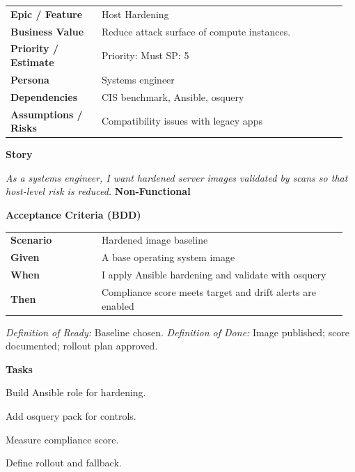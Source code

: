 \documentclass[11pt,letterpaper]{article}
\makeatletter
\newenvironment{kvtable}{%
  \begin{tabular}{@{}>{\bfseries\arraybackslash}p{0.26\linewidth} p{0.70\linewidth}@{}}
}{\end{tabular}}
\newenvironment{bdd}{%
  \begin{tabular}{@{}>{\bfseries\arraybackslash}p{0.26\linewidth} p{0.70\linewidth}@{}}
}{\end{tabular}}
\newcommand{\DoRDoD}[2]{%
  \vspace{0.35em}
  {\footnotesize\color{Muted}%
    \textit{Definition of Ready:} #1 \; \textbullet\;
    \textit{Definition of Done:} #2%
  }%
}
\newenvironment{storycard}[2]{%
  \begin{tcolorbox}[cloudcard, title={#1 --- #2}]%
}{\end{tcolorbox}}
\newcommand{\sectionlabel}[1]{\vspace{0.35em}\textbf{#1}\par}
\makeatother
\begin{document}
\begin{storycard}{CCS-17}{Ch. 17 — Locking Down Cloud Servers}
\begin{kvtable}
Epic / Feature & Host Hardening\\
Business Value & Reduce attack surface of compute instances.\\
Priority / Estimate & Priority: Must \quad SP: 5\\
Persona & Systems engineer\\
Dependencies & CIS benchmark, Ansible, osquery\\
Assumptions / Risks & Compatibility issues with legacy apps\\
\end{kvtable}
\sectionlabel{Story}
\textit{As a systems engineer, I want hardened server images validated by scans so that host-level risk is reduced.}
\sectionlabel{Non-Functional}\;
\sectionlabel{Acceptance Criteria (BDD)}
\begin{bdd}
Scenario & Hardened image baseline\\
Given & A base operating system image\\
When & I apply Ansible hardening and validate with osquery\\
Then & Compliance score meets target and drift alerts are enabled\\
\end{bdd}
\DoRDoD{Baseline chosen.}{Image published; score documented; rollout plan approved.}
\sectionlabel{Tasks}
\begin{checklist}
\item Build Ansible role for hardening.
\item Add osquery pack for controls.
\item Measure compliance score.
\item Define rollout and fallback.
\end{checklist}
\end{storycard}
\end{document}
